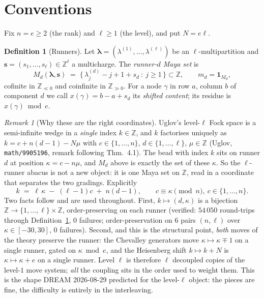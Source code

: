 \documentclass[11pt]{article}
\theoremstyle{definition}
\newtheorem{definition}[theorem]{Definition}
\theoremstyle{remark}
\newtheorem{remark}[theorem]{Remark}
\newcommand{\Z}{\mathbb{Z}}
\newcommand{\bl}{\boldsymbol{\lambda}}
\newcommand{\bs}{\mathbf{s}}
\begin{document}
\section{Conventions}

Fix $n=e\ge2$ (the rank) and $\ell\ge1$ (the level), and put $N=e\ell$.

\begin{definition}[Runners]\label{def:runner}
Let $\bl=(\lambda^{(1)},\dots,\lambda^{(\ell)})$ be an $\ell$-multipartition and
$\bs=(s_1,\dots,s_\ell)\in\Z^\ell$ a multicharge. The \emph{runner-$d$ Maya set} is
\[
M_d(\bl,\bs)\;=\;\{\,\lambda^{(d)}_j-j+1+s_d\ :\ j\ge1\,\}\subset\Z ,
\qquad m_d=\mathbf 1_{M_d},
\]
cofinite in $\Z_{\ll0}$ and coinfinite in $\Z_{\gg0}$.
For a node $\gamma$ in row $a$, column $b$ of component $d$ we call
$x(\gamma)=b-a+s_d$ its \emph{shifted content}; its residue is $x(\gamma)\bmod e$.
\end{definition}

\begin{remark}[Why these are the right coordinates]\label{rem:units}
Uglov's level-$\ell$ Fock space is a semi-infinite wedge in a \emph{single} index
$k\in\Z$, and $k$ factorises uniquely as $k=c+n(d-1)-N\mu$ with $c\in\{1,\dots,n\}$,
$d\in\{1,\dots,\ell\}$, $\mu\in\Z$ (Uglov, \texttt{math/9905196}, remark following
Thm.\ 4.1). The bead with index $k$ sits on runner $d$ at position $\kappa=c-n\mu$, and
$M_d$ above is exactly the set of these $\kappa$. So the $\ell$-runner abacus is not a
new object: it is one Maya set on $\Z$, read in a coordinate that separates the two
gradings. Explicitly
\[
k \;=\; \ell\,\kappa \;-\;(\ell-1)c \;+\; n(d-1),\qquad c\equiv\kappa \pmod n,\ c\in\{1,\dots,n\}.
\]
Two facts follow and are used throughout. First, $k\mapsto(d,\kappa)$ is a bijection
$\Z\to\{1,\dots,\ell\}\times\Z$, order-preserving on each runner
(verified: $54\,050$ round-trips through Definition~\ref{def:runner}, $0$ failures;
order-preservation on $6$ pairs $(n,\ell)$ over $\kappa\in[-30,30]$, $0$ failures).
Second, and this is the structural point,
\emph{both} moves of the theory preserve the runner: the Chevalley generators move
$\kappa\mapsto\kappa\mp1$ on a single runner, gated on $\kappa\bmod e$, and the
Heisenberg shift $k\mapsto k+N$ is $\kappa\mapsto\kappa+e$ on a single runner. Level
$\ell$ is therefore $\ell$ decoupled copies of the level-$1$ move system; \emph{all}
the coupling sits in the order used to weight them. This is the shape DREAM 2026-08-29
predicted for the level-$\ell$ object: the pieces are fine, the difficulty is entirely
in the interleaving.
\end{remark}
\end{document}
